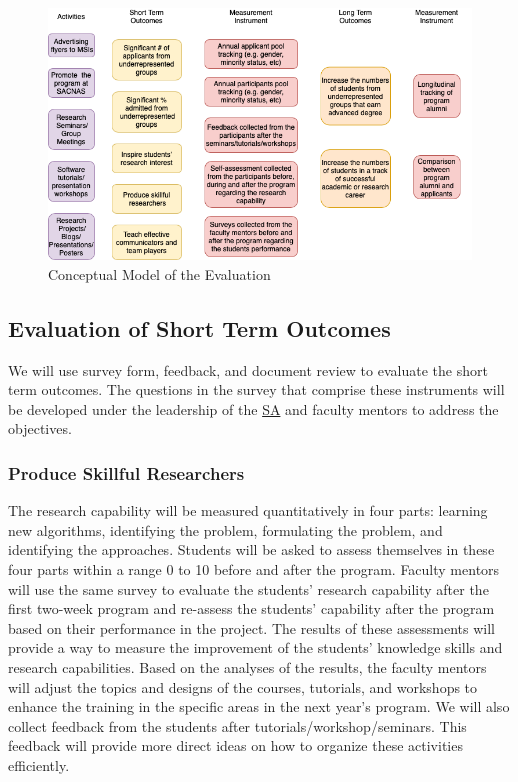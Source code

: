 \documentclass[11pt]{NSFamsart}
\newcommand{\SA}{\hyperlink{SAlink}{SA}\xspace}
\begin{document}
\begin{figure}[tbh]
    \centering
    \includegraphics[width = 14cm]{EvaluationPlan.png}
    \caption{Conceptual Model of the Evaluation}
    \label{fig:my_label}
\end{figure}

\subsection{Evaluation of Short Term Outcomes}

We will use survey form, feedback, and document review to evaluate the short term outcomes. The questions in the survey that comprise these instruments will be developed under the leadership of the \SA and faculty mentors to address the objectives.
\subsubsection{Produce Skillful Researchers} \label{sec:hardskill}
The research capability will be measured quantitatively in four parts: learning new algorithms, identifying the problem, formulating the problem, and identifying the approaches.
Students will be asked to assess themselves in these four parts within a range 0 to 10 before and after the program. Faculty mentors will use the same survey to evaluate the students’ research capability after the first two-week program and re-assess the students’ capability after the program based on their performance in the project.
The results of these assessments will provide a way to measure the improvement of the students' knowledge skills and research capabilities. Based on the analyses of the results, the faculty mentors will adjust the topics and designs of the courses, tutorials,  and workshops to enhance the training in the specific areas in the next year's program.
We will also collect feedback from the students after tutorials/workshop/seminars. This feedback will provide more direct ideas on how to organize these activities efficiently.
\end{document}
